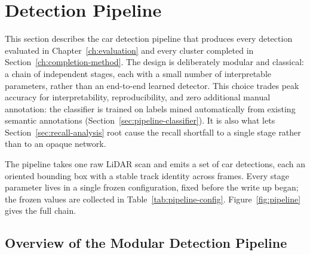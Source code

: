 \documentclass[a4paper,12pt]{report}
\begin{document}
\section{Detection Pipeline}
\label{sec:meth-detection}

This section describes the car detection pipeline that produces every detection
evaluated in Chapter~\ref{ch:evaluation} and every cluster completed in
Section~\ref{ch:completion-method}. The
design is deliberately modular and classical: a chain of independent stages,
each with a small number of interpretable parameters, rather than an end-to-end
learned detector. This choice trades peak accuracy for interpretability,
reproducibility, and zero additional manual annotation: the classifier is trained on
labels mined automatically from existing semantic annotations
(Section~\ref{sec:pipeline-classifier}). It is also what lets Section~\ref{sec:recall-analysis}
root cause the recall shortfall to a single stage rather than to an opaque
network.

The pipeline takes one raw LiDAR scan and emits a set of car detections, each an
oriented bounding box with a stable track identity across frames. Every stage
parameter lives in a single frozen configuration, fixed before the write up began; the frozen
values are collected in Table~\ref{tab:pipeline-config}. Figure~\ref{fig:pipeline}
gives the full chain.

\subsection{Overview of the Modular Detection Pipeline}
\label{sec:pipeline-overview}
\end{document}
